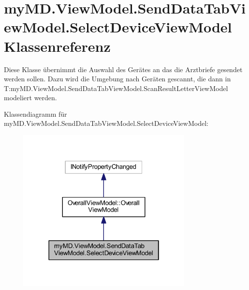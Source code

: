 \hypertarget{classmy_m_d_1_1_view_model_1_1_send_data_tab_view_model_1_1_select_device_view_model}{}\section{my\+M\+D.\+View\+Model.\+Send\+Data\+Tab\+View\+Model.\+Select\+Device\+View\+Model Klassenreferenz}
\label{classmy_m_d_1_1_view_model_1_1_send_data_tab_view_model_1_1_select_device_view_model}


Diese Klasse übernimmt die Auswahl des Gerätes an das die Arztbriefe gesendet werden sollen. Dazu wird die Umgebung nach Geräten gescannt, die dann in T\+:my\+M\+D.\+View\+Model.\+Send\+Data\+Tab\+View\+Model.\+Scan\+Result\+Letter\+View\+Model modeliert werden.  




Klassendiagramm für my\+M\+D.\+View\+Model.\+Send\+Data\+Tab\+View\+Model.\+Select\+Device\+View\+Model\+:\nopagebreak
\begin{figure}[H]
\begin{center}
\leavevmode
\includegraphics[width=250pt]{classmy_m_d_1_1_view_model_1_1_send_data_tab_view_model_1_1_select_device_view_model__inherit__graph}
\end{center}
\end{figure}


